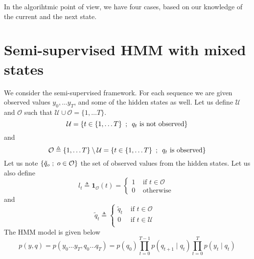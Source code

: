 \documentclass[a4paper, 11pt]{article}
\newcommand{\set}[2]{\left\{ #1 \hspace{.5em} ; \hspace{.5em}#2 \right\}}
\newcommand{\eqdef}{\triangleq}
\newcommand{\conde}[2]{\mathop{\mathbb{E}}\left[#1 \hspace{.2em}\mid\hspace{.2em} #2 \right]}
\newcommand{\ssemi}{\hspace{.3em};\hspace{.3em}}
\begin{document}
In the algorihtmic point of view, we have four cases, based on our
knowledge of the current and the next state.










\section{Semi-supervised HMM with mixed states}

We consider the semi-supervised framework. For each sequence we are
given observed values $y_0, \dots y_T$, and some of the hidden states
as well. Let us define $\mathcal{U}$ and $\mathcal{O}$ such that
$\mathcal{U} \cup \mathcal{O} = \{1, \dots T\}$.
\begin{displaymath}
  \mathcal{U} = \set{t \in \{1, \dots T\}}{\text{$q_t$ is not observed}}
\end{displaymath}
and
\begin{displaymath}
  \mathcal{O} \eqdef \{1, \dots T\} \setminus \mathcal{U} = \set{t \in \{1, \dots T\}}{\text{$q_t$ is observed}}
\end{displaymath}
Let us note $\{\tilde{q}_o \ssemi o \in \mathcal{O}\}$ the set of observed
values from the hidden states. Let us also define
\begin{displaymath}
  l_{t} \eqdef \mathbf{1}_\mathcal{O}(t) = \left\{
    \begin{array}{ll}
      1 &\text{ if $t \in \mathcal{O}$ }\\
      0 &\text{ otherwise }
    \end{array}
  \right.
\end{displaymath}
and
\begin{displaymath}
  \tilde{q}_{t} \eqdef \left\{
    \begin{array}{ll}
      \tilde{q}_t &\text{ if $t \in \mathcal{O}$ }\\
      0 &\text{ if $t \in \mathcal{U}$ }\\
    \end{array}
  \right.
\end{displaymath}
The HMM model is given below
\begin{displaymath}
  p(y, q) = p(y_0 \dots y_T, q_0 \dots q_T) = p(q_0) \prod_{t = 0}^{T-1} p(q_{t+1} \mid q_t) \prod_{t = 0}^{T} p(y_t \mid q_t)
\end{displaymath}
\end{document}
